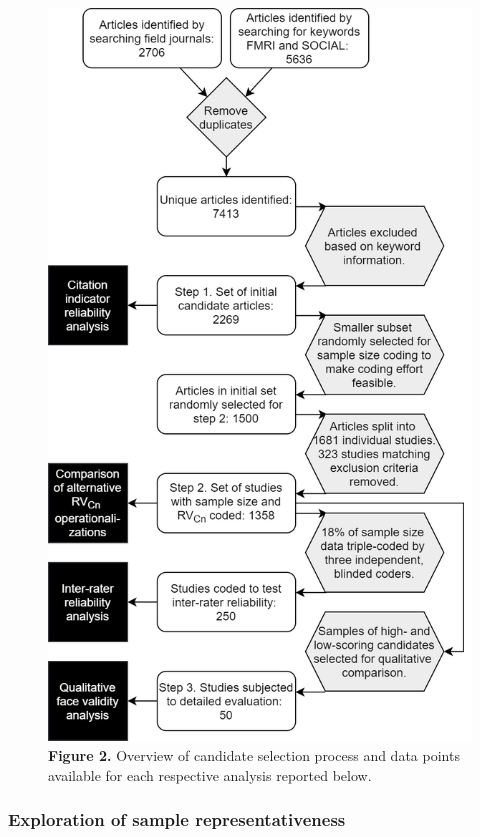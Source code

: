 \documentclass[
  man,floatsintext]{apa6}
\begin{document}
\begin{figure}
\centering
\includegraphics{sample_selection_process.png}
\caption{\textbf{Figure 2.} Overview of candidate selection process and data points available for each respective analysis reported below.}
\end{figure}

\hypertarget{exploration-of-sample-representativeness}{%
\subsubsection{Exploration of sample representativeness}\label{exploration-of-sample-representativeness}}
\end{document}
